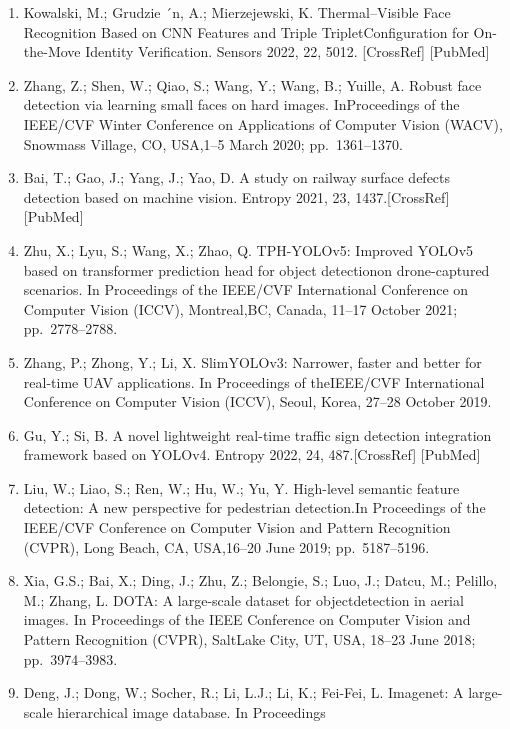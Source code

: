 \documentclass[
  10
]{article}
\begin{document}
\begin{enumerate}
\def\labelenumi{\arabic{enumi}.}
\item
  Kowalski, M.; Grudzie ´n, A.; Mierzejewski, K. Thermal--Visible Face
  Recognition Based on CNN Features and Triple TripletConfiguration for
  On-the-Move Identity Verification. Sensors 2022, 22, 5012.
  {[}CrossRef{]} {[}PubMed{]}
\item
  Zhang, Z.; Shen, W.; Qiao, S.; Wang, Y.; Wang, B.; Yuille, A. Robust
  face detection via learning small faces on hard images. InProceedings
  of the IEEE/CVF Winter Conference on Applications of Computer Vision
  (WACV), Snowmass Village, CO, USA,1--5 March 2020; pp.~1361--1370.
\item
  Bai, T.; Gao, J.; Yang, J.; Yao, D. A study on railway surface defects
  detection based on machine vision. Entropy 2021, 23,
  1437.{[}CrossRef{]} {[}PubMed{]}
\item
  Zhu, X.; Lyu, S.; Wang, X.; Zhao, Q. TPH-YOLOv5: Improved YOLOv5 based
  on transformer prediction head for object detectionon drone-captured
  scenarios. In Proceedings of the IEEE/CVF International Conference on
  Computer Vision (ICCV), Montreal,BC, Canada, 11--17 October 2021;
  pp.~2778--2788.
\item
  Zhang, P.; Zhong, Y.; Li, X. SlimYOLOv3: Narrower, faster and better
  for real-time UAV applications. In Proceedings of theIEEE/CVF
  International Conference on Computer Vision (ICCV), Seoul, Korea,
  27--28 October 2019.
\item
  Gu, Y.; Si, B. A novel lightweight real-time traffic sign detection
  integration framework based on YOLOv4. Entropy 2022, 24,
  487.{[}CrossRef{]} {[}PubMed{]}
\item
  Liu, W.; Liao, S.; Ren, W.; Hu, W.; Yu, Y. High-level semantic feature
  detection: A new perspective for pedestrian detection.In Proceedings
  of the IEEE/CVF Conference on Computer Vision and Pattern Recognition
  (CVPR), Long Beach, CA, USA,16--20 June 2019; pp.~5187--5196.
\item
  Xia, G.S.; Bai, X.; Ding, J.; Zhu, Z.; Belongie, S.; Luo, J.; Datcu,
  M.; Pelillo, M.; Zhang, L. DOTA: A large-scale dataset for
  objectdetection in aerial images. In Proceedings of the IEEE
  Conference on Computer Vision and Pattern Recognition (CVPR), SaltLake
  City, UT, USA, 18--23 June 2018; pp.~3974--3983.
\item
  Deng, J.; Dong, W.; Socher, R.; Li, L.J.; Li, K.; Fei-Fei, L.
  Imagenet: A large-scale hierarchical image database. In Proceedings

\end{enumerate}
\end{document}
